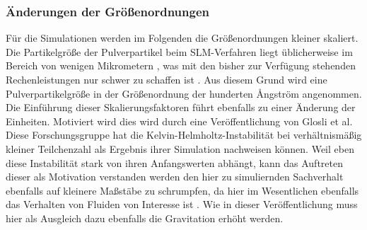 		\subsubsection{Änderungen der Größenordnungen}
		Für die Simulationen werden im Folgenden die Größenordnungen kleiner skaliert. Die
		Partikelgröße der Pulverpartikel beim SLM-Verfahren liegt üblicherweise im Bereich von
		wenigen Mikrometern \cite{hajnys2020research}, was mit den bisher zur Verfügung stehenden
		Rechenleistungen nur schwer zu schaffen ist \cite{eckhardt2013scientists}. Aus diesem
		Grund wird eine Pulverpartikelgröße in der Größenordnung der hunderten \AA ngström
		angenommen. Die Einführung dieser Skalierungsfaktoren führt ebenfalls zu einer Änderung
		der Einheiten. Motiviert wird dies wird durch eine Veröffentlichung von Glosli et al.
		Diese Forschungsgruppe hat die Kelvin-Helmholtz-Instabilität bei verhältnismäßig kleiner
		Teilchenzahl als Ergebnis ihrer Simulation nachweisen können. Weil eben diese Instabilität
		stark von ihren Anfangswerten abhängt, kann das Auftreten dieser als Motivation verstanden
		werden den hier zu simuliernden Sachverhalt ebenfalls auf kleinere Maßstäbe zu schrumpfen,
		da hier im Wesentlichen ebenfalls das Verhalten von Fluiden von Interesse ist
		\cite{glosli2007extending}. Wie in dieser Veröffentlichung muss hier als Ausgleich dazu
		ebenfalls die Gravitation erhöht werden.


